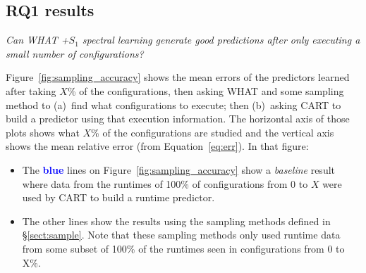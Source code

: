 \documentclass{sig-alternative}
\newcommand{\bi}{\begin{itemize}}%
\newcommand{\ei}{\end{itemize}}
\newcommand{\tion}[1]{\S\ref{sect:#1}}
\newcommand{\fig}[1]{Figure~\ref{fig:#1}}
\newcommand{\eq}[1]{Equation~\ref{eq:#1}}
\begin{document}
\subsection{RQ1 results}
{\em Can  WHAT  +$S_1$ spectral learning generate good predictions after only
executing a small number of configurations?}

\fig{sampling_accuracy} shows the mean errors of the predictors learned
after taking $X$\% of the configurations, then asking  WHAT and some sampling method
to (a)~find what configurations to execute; then (b)~asking CART to build a predictor
using that execution information. The horizontal axis of those plots shows what $X$\%
of the configurations are studied and the vertical axis shows the mean relative error (from \eq{err}).
In that figure:
\bi
\item
The \textcolor{blue}{{\bf blue}} lines on \fig{sampling_accuracy} show a {\em baseline} result
where data from the runtimes of 100\% of  configurations from 0 to $X$ were used by CART
to build a runtime predictor.
\item
The other lines show the results using the sampling methods defined in \tion{sample}.
Note that these sampling methods only used  runtime data from
some subset of 100\% of the runtimes seen in configurations
from 0 to X\%.
\ei
\end{document}
